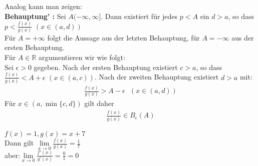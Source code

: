 \begin{Satz}
{\begin{itemize}
		Analog kann man zeigen: \\
		\textbf{Behauptung' :} Sei $A (-\infty, \infty]$. Dann existiert für 
		jedes $p <A$ ein $d > a$, so dass $p < \frac{f(x)}{g(x)}$ $(x \in (a,d))$\\
		Für $A = +\infty$ folgt die Aussage aus der letzten Behauptung, für 
		$ A = - \infty$ aus der ersten Behauptung. \\
		Für $A \in \mathbb{R}$ argumentieren wir wie folgt: \\
		Sei $\epsilon > 0$ gegeben. Nach der ersten Behauptung existiert 
		$c > a$, so dass $\frac{f(x)}{g(x)} < A + \epsilon$ $(x\in (a,c))$. 
		Nach der zweiten Behauptung existiert $d > a$ mit:
		\begin{align*}
			\frac{f(x)}{g(x)} > A - \epsilon \text{ } (x \in (a,d))
		\end{align*}
		Für $x \in (a, \min\{c,d\})$ gilt daher
		\begin{align*}
			\frac{f(x)}{g(x)} \in B_{\epsilon}(A)
		\end{align*}
	\end{itemize}	
	
}\end{Satz}

\begin{Beispiel}{
	$f(x) = 1, g(x) = x + 7$\\
	Dann gilt $\lim\limits_{x \rightarrow 0 }{\frac{f(x)}{g(x)} = \frac{1}{7}}$ \\
 aber:$ \lim\limits_{x \rightarrow 0 }{\frac{f'(x)}{g'(x)} = \frac{0}{	1}= 0}$
}\end{Beispiel}
